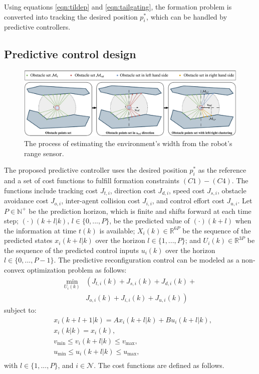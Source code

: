 Using equations \eqref{eqn:tildep} and \eqref{eqn:tailgating}, the formation problem is converted into tracking the desired position $p_i^*$, which can be handled by predictive controllers. 

\subsection{Predictive control design} 
\begin{figure}
    \centering
    \includegraphics[width=\textwidth]{paper3/images/perception.pdf}
    \caption{The process of estimating the environment's width from the robot's range sensor.}
    \label{fig:perception}
\end{figure}
The proposed predictive controller uses the desired position $p_i^*$ as the reference and a set of cost functions to fulfill formation constraints $(C1)-(C4)$. The functions include tracking cost $J_{t,i}$, direction cost $J_{d,i}$, speed cost $J_{s,i}$, obstacle avoidance cost $J_{o,i}$, inter-agent collision cost $J_{i,i}$, and control effort cost $J_{u,i}$. Let $P\in\mathbb{N}^+$ be the prediction horizon, which is finite and shifts forward at each time step; $(\cdot)(k+l|k )$, $l \in\{0,...,P\}$, be the predicted value of $(\cdot)(k+l )$ when the information at time $t(k)$ is available; $X_i(k)\in\mathbb{R}^{6P}$ be the sequence of the predicted states $x_i(k+l|k)$ over the horizon $l\in\{1,...,P\}$; and $U_i(k)\in\mathbb{R}^{3P}$ be the sequence of the predicted control inputs $u_i(k)$ over the horizon $l\in\{0,...,P-1\}$. The predictive reconfiguration control can be modeled as a non-convex optimization problem as follows:
\begin{equation}
\begin{aligned}
    \min_{U_i(k)}&\left(J_{t,i}(k)+J_{s,i}(k)+J_{d,i}(k)+\right.\\
    &\left.J_{o,i}(k)+J_{i,i}(k)+J_{u,i}(k)\right)
\end{aligned}
    \label{eqn:J}
\end{equation}
subject to:
\begin{equation}
    \begin{aligned}
        &x_i(k+l+1|k)=Ax_i(k+l|k)+Bu_i(k+l|k),\\
        &x_i(k|k)=x_i(k),\\
        &v_\text{min}\leq v_i(k+l|k)\leq v_\text{max},\\
        &u_\text{min}\leq u_i(k+l|k)\leq u_\text{max},\\
    \end{aligned}
    \label{eqn:constraints}
\end{equation}
with $l\in\{1,...,P\}$, and $i\in\mathcal{N}$. The cost functions are defined as follows.

